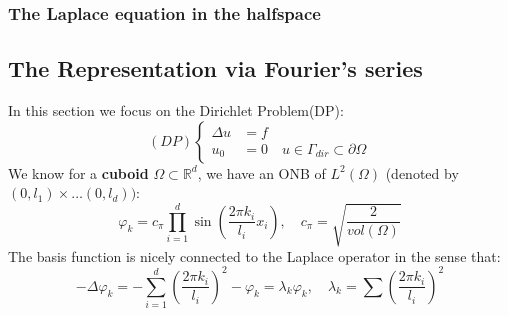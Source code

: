 \documentclass[a4paper,11pt,oneside,fleqn]{book}
\theoremstyle{definition}
\theoremstyle{remark}
\begin{document}
\subsubsection{The Laplace equation in the halfspace}



\subsection{The Representation via Fourier's series}
In this section we focus on the Dirichlet Problem(DP):
\begin{equation}\label{PE:DP(simple)}
(DP)\left\{
\begin{aligned}
	\Delta u &= f \\
	u_0 &= 0 \quad u \in \Gamma_{dir} \subset \partial\Omega
\end{aligned}
\right.	
\end{equation} 
We know for a \textbf{cuboid} $\Omega \subset \mathbb{R}^d$, we have an ONB of $L^2(\Omega)$ (denoted by $(0, l_1)\times \dots (0, l_d)) $:
\begin{equation}
	\varphi_k = c_\pi \prod_{i = 1}^d \sin(\frac{2\pi k_i}{l_i}x_i)	, \quad c_\pi = \sqrt{\frac{2}{vol(\Omega)}}
\end{equation} 
The basis function is nicely connected to the Laplace operator in the sense that:
\begin{equation*}
	-\Delta \varphi_k = -\sum_{i = 1}^d (\frac{2\pi k_i}{l_i})^2-\varphi_k = \lambda_k \varphi_k, \quad \lambda_k = \sum (\frac{2\pi k_i}{l_i})^2
\end{equation*}
\end{document}

